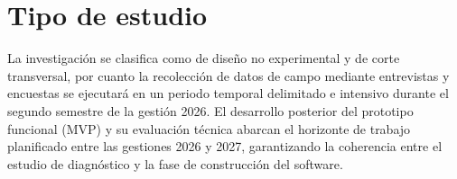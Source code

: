 \section{Tipo de estudio}

La investigación se clasifica como de diseño no experimental y de corte transversal, por cuanto la recolección de datos de campo mediante entrevistas y encuestas se ejecutará en un periodo temporal delimitado e intensivo durante el segundo semestre de la gestión 2026. El desarrollo posterior del prototipo funcional (MVP) y su evaluación técnica abarcan el horizonte de trabajo planificado entre las gestiones 2026 y 2027, garantizando la coherencia entre el estudio de diagnóstico y la fase de construcción del software.